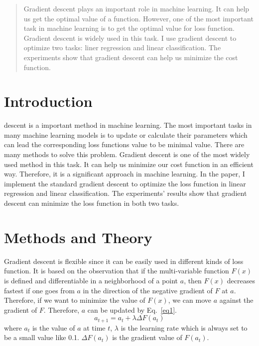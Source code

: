 \documentclass[journal, a4paper]{IEEEtran}
\begin{document}
\begin{abstract}
Gradient descent plays an important role in machine learning. It can help us get the optimal value of a function. However, one of the most important task in machine learning is to get the optimal value for loss function. Gradient descent is widely used in this task. I use gradient descent to optimize two tasks: liner regression and linear classification. The experiments show that gradient descent can help us minimize the cost function.
\end{abstract}

\section{Introduction}
 descent is a important method in machine learning. The most important tasks in many machine learning models is to update or calculate their parameters which can lead the corresponding loss functions value to be minimal value. There are many methods to solve this problem. Gradient descent is one of the most widely used method in this task. It can help us minimize our cost function in an efficient way. Therefore, it is a significant approach in machine learning. In the paper, I implement the standard gradient descent to optimize the loss function in linear regression and linear classification. The experiments' results show that gradient descent can minimize the loss function in both two tasks.

\section{Methods and Theory}
Gradient descent is flexible since it can be easily used in different kinds of loss function. It is based on the observation that if the multi-variable function $F(x)$ is defined and differentiable in a neighborhood of a point $a$, then $F(x)$ decreases fastest if one goes from $a$ in the direction of the negative gradient of $F$ at $a$. Therefore, if we want to minimize the value of $F(x)$, we can move $a$ against the gradient of $F$. Therefore, $a$ can be updated by Eq.~\eqref{eq1}.
\begin{equation}
a_{t+1}=a_{t} + \lambda \Delta F(a_{t}) \label{eq1}
\end{equation}
where $a_{t}$ is the value of $a$ at time $t$, $\lambda$ is the learning rate which is always set to be a small value like 0.1. $\Delta F(a_{t})$ is the gradient value of $F(a_{t})$.
\end{document}
